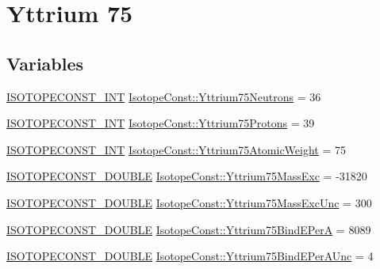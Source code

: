 \hypertarget{group___isotope_const-_yttrium-_y75}{}\section{Yttrium 75}
\label{group___isotope_const-_yttrium-_y75}
\subsection*{Variables}
\begin{DoxyCompactItemize}
\item 
\mbox{\hyperlink{group___isotope_const-_macros_ga5f18360b3e99483a35c32d789e62621c}{I\+S\+O\+T\+O\+P\+E\+C\+O\+N\+S\+T\+\_\+\+I\+NT}} \mbox{\hyperlink{group___isotope_const-_yttrium-_y75_ga22470066b35522a0c5ed0efa7b5ded0d}{Isotope\+Const\+::\+Yttrium75\+Neutrons}} = 36
\item 
\mbox{\hyperlink{group___isotope_const-_macros_ga5f18360b3e99483a35c32d789e62621c}{I\+S\+O\+T\+O\+P\+E\+C\+O\+N\+S\+T\+\_\+\+I\+NT}} \mbox{\hyperlink{group___isotope_const-_yttrium-_y75_gaa92f5947f78b4156e7c1ebfcf6c304c6}{Isotope\+Const\+::\+Yttrium75\+Protons}} = 39
\item 
\mbox{\hyperlink{group___isotope_const-_macros_ga5f18360b3e99483a35c32d789e62621c}{I\+S\+O\+T\+O\+P\+E\+C\+O\+N\+S\+T\+\_\+\+I\+NT}} \mbox{\hyperlink{group___isotope_const-_yttrium-_y75_gaf698a58bbc738bb103ef26048d756e0e}{Isotope\+Const\+::\+Yttrium75\+Atomic\+Weight}} = 75
\item 
\mbox{\hyperlink{group___isotope_const-_macros_ga8f45a7272ce02c0b4c65c44636ed719a}{I\+S\+O\+T\+O\+P\+E\+C\+O\+N\+S\+T\+\_\+\+D\+O\+U\+B\+LE}} \mbox{\hyperlink{group___isotope_const-_yttrium-_y75_ga5e9f881d1f886b325470373560c6e8fe}{Isotope\+Const\+::\+Yttrium75\+Mass\+Exc}} = -\/31820
\item 
\mbox{\hyperlink{group___isotope_const-_macros_ga8f45a7272ce02c0b4c65c44636ed719a}{I\+S\+O\+T\+O\+P\+E\+C\+O\+N\+S\+T\+\_\+\+D\+O\+U\+B\+LE}} \mbox{\hyperlink{group___isotope_const-_yttrium-_y75_ga060fafbf2689e3809491a94024656bec}{Isotope\+Const\+::\+Yttrium75\+Mass\+Exc\+Unc}} = 300
\item 
\mbox{\hyperlink{group___isotope_const-_macros_ga8f45a7272ce02c0b4c65c44636ed719a}{I\+S\+O\+T\+O\+P\+E\+C\+O\+N\+S\+T\+\_\+\+D\+O\+U\+B\+LE}} \mbox{\hyperlink{group___isotope_const-_yttrium-_y75_gad42c7af9f2553a8c036f7b6af0d20b87}{Isotope\+Const\+::\+Yttrium75\+Bind\+E\+PerA}} = 8089
\item 
\mbox{\hyperlink{group___isotope_const-_macros_ga8f45a7272ce02c0b4c65c44636ed719a}{I\+S\+O\+T\+O\+P\+E\+C\+O\+N\+S\+T\+\_\+\+D\+O\+U\+B\+LE}} \mbox{\hyperlink{group___isotope_const-_yttrium-_y75_ga66a84c7f2cfb210d94f1f78705ad9ebc}{Isotope\+Const\+::\+Yttrium75\+Bind\+E\+Per\+A\+Unc}} = 4

\end{DoxyCompactItemize}
